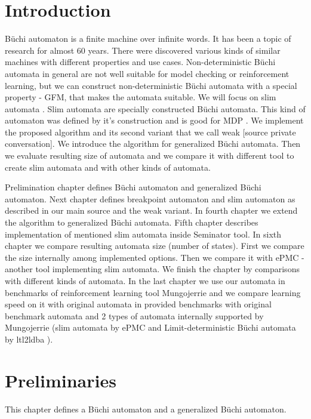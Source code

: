 \documentclass[
	digital
nolof, nolot
]{fithesis3}
\begin{document}
	\chapter{Introduction}
	Büchi automaton is a finite machine over infinite words. It has been a topic of research for almost 60 years.
	There were discovered various kinds of similar machines with different properties and use cases.
	Non-deterministic Büchi automata in general are not well suitable for model checking or reinforcement learning, but we can construct non-deterministic Büchi automata with a special property - GFM, that makes the automata suitable. We will focus on slim automata \cite{hlavni}.
	Slim automata are specially constructed Büchi automata. This kind of automaton was defined by it's construction and is good for MDP \cite{hlavni}. We implement the proposed algorithm and its second variant that we call weak [source private conversation]. We introduce the algorithm for generalized Büchi automata. Then we evaluate resulting size of automata and we compare it with different tool to create slim automata and with other kinds of automata.
	
	Prelimination chapter defines Büchi automaton and generalized Büchi automaton. Next chapter defines breakpoint automaton and slim automaton as described in our main source \cite{hlavni} and the weak variant. In fourth chapter we extend the algorithm to generalized Büchi automata. Fifth chapter describes implementation of mentioned slim automata inside Seminator\cite{seminator} tool. In sixth chapter we compare resulting automata size (number of states). First we compare the size internally among implemented options. Then we compare it with ePMC \cite{epmc} - another tool implementing slim automata. We finish the chapter by comparisons with different kinds of automata. In the last chapter we use our automata in benchmarks of reinforcement learning tool Mungojerrie\cite{mungojerrie} and we compare learning speed on it with original automata in provided benchmarks with original benchmark automata and 2 types of automata internally supported by Mungojerrie (slim automata by ePMC and Limit-deterministic Büchi automata by ltl2ldba \cite{ltl2ldba}).
	
	

	\chapter{Preliminaries}
		This chapter defines a Büchi automaton and a generalized Büchi automaton. 
		
\end{document}
